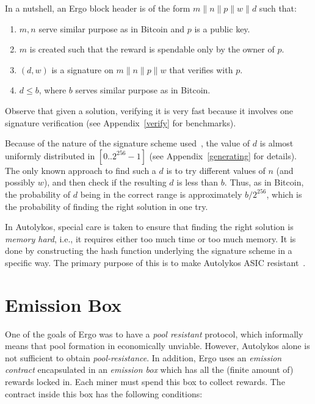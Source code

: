 \documentclass[runningheads]{llncs}
\newcommand{\powname}{Autolykos\xspace}
\begin{document}
In a nutshell, an Ergo block header is of the form $m\|n\|p\|w\|d$ such that:
\begin{enumerate}
	\item $m, n$ serve similar purpose as in Bitcoin and $p$ is a public key.
	\item $m$ is created such that the reward is spendable only by the owner of $p$.
	\item $(d, w)$ is a signature on $m\|n\|p\|w$ that verifies with $p$.
	\item $d\leq b$, where $b$ serves similar purpose as in Bitcoin. 
\end{enumerate}

Observe that given a solution, verifying it is very fast because it involves one signature verification (see Appendix~\ref{verify} for benchmarks).

Because of the nature of the signature scheme used~\cite{autolykos}, the value of $d$ is almost uniformly distributed in $[0..2^{256}-1]$ (see Appendix~\ref{generating} for details). The only known approach to find such a $d$ is to try different values of $n$ (and possibly $w$), and then check if the resulting $d$ is less than $b$.
Thus, as in Bitcoin, the probability of $d$ being in the correct range is approximately $b/2^{256}$, which is the probability of finding the right solution in one try.
  
In \powname, special care is taken to ensure that finding the right solution is {\em memory hard}, i.e., it requires either too much time or too much memory. It is done by constructing the hash function underlying the signature scheme in a specific way. The primary purpose of this is to make \powname ASIC resistant~\cite{autolykos}. 
\section{Emission Box}

\label{emission}

One of the goals of Ergo was to have a {\em pool resistant} protocol, which informally means that pool formation in economically unviable.
However, \powname alone is not sufficient to obtain {\em pool-resistance}. In addition, Ergo uses an {\em emission contract} encapsulated in an {\em emission box} which has all the (finite amount of) rewards locked in. Each miner must spend this box to collect rewards. The contract inside this box has the following conditions:
\end{document}
